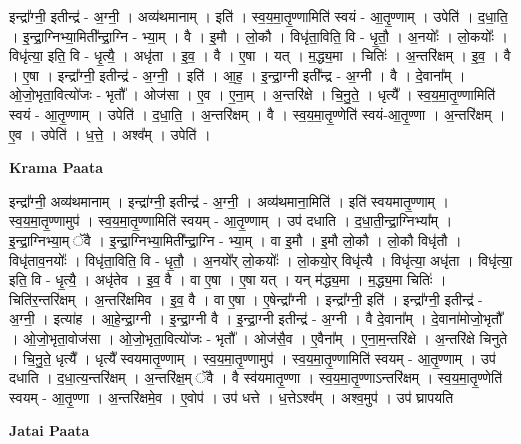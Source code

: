 \documentclass[17pt]{extarticle}
\begin{document}
इन्द्रा᳚ग्नी॒ इतीन्द्र॑ - अ॒ग्नी॒ । अव्य॑थमानाम् । इति॑ । स्व॒य॒मा॒तृ॒ण्णामिति॑ स्वयं - आ॒तृ॒ण्णाम् । उपेति॑ । द॒धा॒ति॒ । इ॒न्द्रा॒ग्निभ्या॒मिती᳚न्द्रा॒ग्नि - भ्या॒म् । वै । इ॒मौ । लो॒कौ । विधृ॑ता॒विति॒ वि - धृ॒तौ॒ । अ॒नयोः᳚ । लो॒कयोः᳚ । विधृ॑त्या॒ इति॒ वि - धृ॒त्यै॒ । अधृ॑ता । इ॒व॒ । वै । ए॒षा । यत् । म॒द्ध्य॒मा । चितिः॑ । अ॒न्तरि॑क्षम् । इ॒व॒ । वै । ए॒षा । इन्द्रा᳚ग्नी॒ इतीन्द्र॑ - अ॒ग्नी॒ । इति॑ । आ॒ह॒ । इ॒न्द्रा॒ग्नी इती᳚न्द्र - अ॒ग्नी । वै । दे॒वाना᳚म् । ओ॒जो॒भृता॒वित्यो॑जः - भृतौ᳚ । ओज॑सा । ए॒व । ए॒ना॒म् । अ॒न्तरि॑क्षे । चि॒नु॒ते॒ । धृत्यै᳚ । स्व॒य॒मा॒तृ॒ण्णामिति॑ स्वयं - आ॒तृ॒ण्णाम् । उपेति॑ । द॒धा॒ति॒ । अ॒न्तरि॑क्षम् । वै । स्व॒य॒मा॒तृ॒ण्णेति॑ स्वयं-आ॒तृ॒ण्णा । अ॒न्तरि॑क्षम् । ए॒व । उपेति॑ । ध॒त्ते॒ । अश्व᳚म् । उपेति॑ ।  \newline


\textbf{Krama Paata} \newline

इन्द्रा᳚ग्नी॒ अव्य॑थमानाम् । इन्द्रा॑ग्नी॒ इतीन्द्र॑ - अ॒ग्नी॒ । अव्य॑थमाना॒मिति॑ । इति॑ स्वयमातृ॒ण्णाम् । स्व॒य॒मा॒तृ॒ण्णामुप॑ । स्व॒य॒मा॒तृ॒ण्णामिति॑ स्वयम् - आ॒तृ॒ण्णाम् । उप॑ दधाति । द॒धा॒ती॒न्द्रा॒ग्निभ्या᳚म् । इ॒न्द्रा॒ग्निभ्या॒म् ॅवै । इ॒न्द्रा॒ग्निभ्या॒मिती᳚न्द्रा॒ग्नि - भ्या॒म् । वा इ॒मौ । इ॒मौ लो॒कौ । लो॒कौ विधृ॑तौ । विधृ॑ताव॒नयोः᳚ । विधृ॑ता॒विति॒ वि - धृ॒तौ॒ । अ॒नयो᳚र् लो॒कयोः᳚ । लो॒कयो॒र् विधृ॑त्यै । विधृ॑त्या॒ अधृ॑ता । विधृ॑त्या॒ इति॒ वि - धृ॒त्यै॒ । अधृ॑तेव । इ॒व॒ वै । वा ए॒षा । ए॒षा यत् । यन् म॑द्ध्य॒मा । म॒द्ध्य॒मा चितिः॑ । चिति॑र॒न्तरि॑क्षम् । अ॒न्तरि॑क्षमिव । इ॒व॒ वै । वा ए॒षा । ए॒षेन्द्रा᳚ग्नी । इन्द्रा᳚ग्नी॒ इति॑ । इन्द्रा᳚ग्नी॒ इतीन्द्र॑ - अ॒ग्नी॒ । इत्या॑ह । आ॒हे॒न्द्रा॒ग्नी । इ॒न्द्रा॒ग्नी वै । इ॒न्द्रा॒ग्नी इतीन्द्र॑ - अ॒ग्नी । वै दे॒वाना᳚म् । दे॒वाना॑मोजो॒भृतौ᳚ । ओ॒जो॒भृता॒वोज॑सा । ओ॒जो॒भृता॒वित्यो॑जः - भृतौ᳚ । ओज॑सै॒व । ए॒वैना᳚म् । ए॒ना॒म॒न्तरि॑क्षे । अ॒न्तरि॑क्षे चिनुते । चि॒नु॒ते॒ धृत्यै᳚ । धृत्यै᳚ स्वयमातृ॒ण्णाम् । स्व॒य॒मा॒तृ॒ण्णामुप॑ । स्व॒य॒मा॒तृ॒ण्णामिति॑ स्वयम् - आ॒तृ॒ण्णाम् । उप॑ दधाति । द॒धा॒त्य॒न्तरि॑क्षम् । अ॒न्तरि॑क्ष॒म् ॅवै । वै स्व॑यमातृ॒ण्णा । स्व॒य॒मा॒तृ॒ण्णाऽन्तरि॑क्षम् । स्व॒य॒मा॒तृ॒ण्णेति॑ स्वयम् - आ॒तृ॒ण्णा । अ॒न्तरि॑क्षमे॒व । ए॒वोप॑ । उप॑ धत्ते । ध॒त्तेऽश्व᳚म् । अश्व॒मुप॑ । उप॑ घ्रापयति \newline

\textbf{Jatai Paata} \newline
\end{document}
